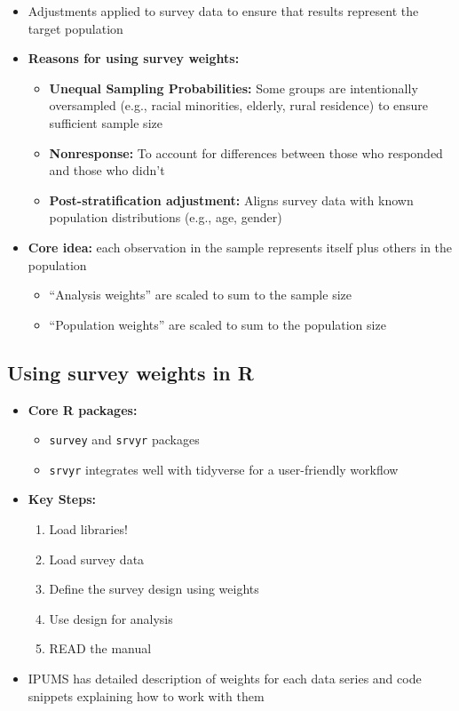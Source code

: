 \documentclass[
  letterpaper,
  DIV=11,
  numbers=noendperiod]{scrartcl}
\providecommand{\tightlist}{%
  \setlength{\itemsep}{0pt}\setlength{\parskip}{0pt}}
\begin{document}
\begin{itemize}
\tightlist
\item
  Adjustments applied to survey data to ensure that results represent
  the target population
\item
  \textbf{Reasons for using survey weights:}

  \begin{itemize}
  \tightlist
  \item
    \textbf{Unequal Sampling Probabilities:} Some groups are
    intentionally oversampled (e.g., racial minorities, elderly, rural
    residence) to ensure sufficient sample size
  \item
    \textbf{Nonresponse:} To account for differences between those who
    responded and those who didn't
  \item
    \textbf{Post-stratification adjustment:} Aligns survey data with
    known population distributions (e.g., age, gender)
  \end{itemize}
\item
  \textbf{Core idea:} each observation in the sample represents itself
  plus others in the population

  \begin{itemize}
  \tightlist
  \item
    ``Analysis weights'' are scaled to sum to the sample size
  \item
    ``Population weights'' are scaled to sum to the population size
  \end{itemize}
\end{itemize}

\subsection{Using survey weights in R}\label{using-survey-weights-in-r}

\begin{itemize}
\tightlist
\item
  \textbf{Core R packages:}

  \begin{itemize}
  \tightlist
  \item
    \texttt{survey} and \texttt{srvyr} packages
  \item
    \texttt{srvyr} integrates well with tidyverse for a user-friendly
    workflow
  \end{itemize}
\item
  \textbf{Key Steps:}

  \begin{enumerate}
  \def\labelenumi{\arabic{enumi}.}
  \tightlist
  \item
    Load libraries!
  \item
    Load survey data
  \item
    Define the survey design using weights
  \item
    Use design for analysis
  \item
    READ the manual
  \end{enumerate}
\item
  IPUMS has detailed description of weights for each data series and
  code snippets explaining how to work with them
\end{itemize}
\end{document}
